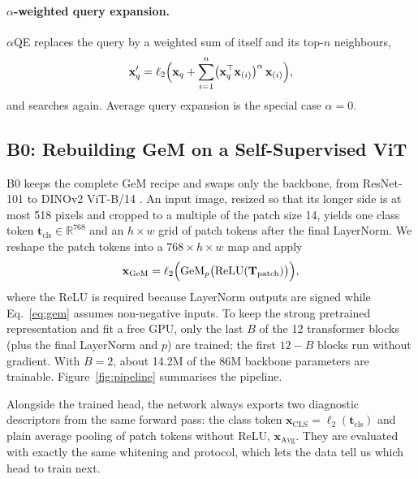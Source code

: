 \documentclass[runningheads]{llncs}
\newcommand{\aqe}{$\alpha$QE}
\begin{document}
\paragraph{$\alpha$-weighted query expansion.}
\aqe{} \cite{radenovic2019gem} replaces the query by a weighted sum of itself
and its top-$n$ neighbours,
\begin{equation}
\mathbf{x}_q' = \ell_2\Bigl(\mathbf{x}_q + \sum_{i=1}^{n} \bigl(\mathbf{x}_q^\top\mathbf{x}_{(i)}\bigr)^{\alpha}\,\mathbf{x}_{(i)}\Bigr),
\label{eq:aqe}
\end{equation}
and searches again. Average query expansion \cite{chum2007totalrecall} is the
special case $\alpha=0$.

\subsection{B0: Rebuilding GeM on a Self-Supervised ViT}
\label{sec:b0}

B0 keeps the complete GeM recipe and swaps only the backbone, from ResNet-101
\cite{he2016resnet} to DINOv2 ViT-B/14 \cite{oquab2024dinov2}. An input image,
resized so that its longer side is at most 518 pixels and cropped to a
multiple of the patch size 14, yields one class token
$\mathbf{t}_{\text{cls}}\in\mathbb{R}^{768}$ and an $h\times w$ grid of patch
tokens after the final LayerNorm. We reshape the patch tokens into a
$768\times h\times w$ map and apply
\begin{equation}
\mathbf{x}_{\text{GeM}}=\ell_2\Bigl(\text{GeM}_p\bigl(\text{ReLU}(\mathbf{T}_{\text{patch}})\bigr)\Bigr),
\end{equation}
where the ReLU is required because LayerNorm outputs are signed while
Eq.~\eqref{eq:gem} assumes non-negative inputs. To keep the strong pretrained
representation and fit a free GPU, only the last $B$ of the 12 transformer
blocks (plus the final LayerNorm and $p$) are trained; the first $12-B$
blocks run without gradient. With $B=2$, about 14.2M of the 86M backbone
parameters are trainable. Figure~\ref{fig:pipeline} summarises the pipeline.

Alongside the trained head, the network always exports two diagnostic
descriptors from the same forward pass: the class token
$\mathbf{x}_{\text{CLS}}=\ell_2(\mathbf{t}_{\text{cls}})$ and plain average
pooling of patch tokens without ReLU, $\mathbf{x}_{\text{Avg}}$. They are
evaluated with exactly the same whitening and protocol, which lets the data
tell us which head to train next.
\end{document}
